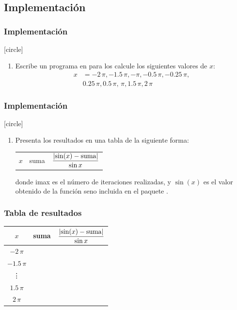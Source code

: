 \subsection*{Implementación}
\begin{frame}[fragile]
\frametitle{Implementación}
[circle]
\begin{enumerate}[<+->]
\item Escribe un programa en \python{} para los calcule los siguientes valores de $x$:
\begin{align*}
x &= -2 \, \pi, -1.5 \, \pi, - \pi, -0.5 \, \pi, -0.25 \, \pi, \\
& 0.25 \, \pi , 0.5 \, \pi, \, \pi, 1.5 \, \pi, 2 \, \pi
\end{align*}
\seti
\end{enumerate}
\end{frame}
\begin{frame}[fragile]
\frametitle{Implementación}
[circle]
\begin{enumerate}[<+->]
\conti   
\item Presenta los resultados en una tabla de la siguiente forma:
\begin{table}
\centering
\begin{tabular}{c | c | c}
$x$ & suma & $\dfrac{\abs{\sin(x) - \mbox{suma}}}{\sin x}$ 
\end{tabular}
\end{table}
donde imax es el número de iteraciones realizadas, y $\sin (x)$ es el valor obtenido de la función seno incluida en el paquete .
\seti
\end{enumerate}
\end{frame}
\begin{frame}[fragile]
\frametitle{Tabla de resultados}
\begin{table}
\centering
\begin{tabular}{c | c | c}
$x$ & suma & $\dfrac{\abs{\sin(x) - \mbox{suma}}}{\sin x}$ \\ \hline
$-2 \, \pi$ & & \\ \hline
$-1.5 \, \pi$ & & \\ \hline
\vdots & & \\ \hline
$1.5 \, \pi$ & & \\ \hline
$2 \, \pi$ & & \\ \hline
\end{tabular}
\end{table}
\end{frame}
